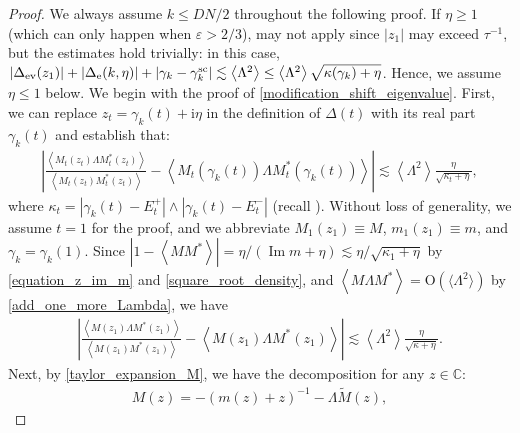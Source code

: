 \documentclass[10pt,reqno]{amsart}
\numberwithin{equation}{section}
\numberwithin{figure}{section}
\theoremstyle{plain} %
\theoremstyle{definition} %
\newcommand{\wt}{\widetilde}
\renewcommand{\txt}[1]{\text{\rm{#1}}}
\newcommand{\C}{\mathbb{C}}
\newcommand{\ii}{\mathrm{i}}
\renewcommand{\leq}{\le}
\renewcommand{\tilde}{\wt}
\newcommand{\pa}[1]{\left({#1}\right)}
\newcommand{\absa}[1]{\left\lvert #1 \right\rvert}
\newcommand{\avg}[1]{\langle #1 \rangle}
\newcommand{\avga}[1]{\left\langle #1 \right\rangle}
\DeclareMathOperator{\im}{\mathrm{Im}}
\newcommand{\OO}{\mathrm{O}}
\numberwithin{equation}{section}
\begin{document}
\begin{proof}
We always assume $k\leq DN/2$ throughout the following proof. If $\eta\ge 1$ (which can only happen when $\varepsilon>2/3$),  may not apply since $|z_1|$ may exceed $\tau^{-1}$, but the estimates hold trivially: in this case, $|\Delta_{\txt{ev}}(z_1)|+|\Delta_{\txt{e}}(k,\eta)|+|\gamma_k-\gamma_k^{\txt{sc}}|\lesssim\avga{\Lambda^2}\le\avga{\Lambda^2}\sqrt{\kappa(\gamma_k)+\eta}$. Hence, we assume $\eta\le 1$ below. We begin with the proof of \eqref{modification_shift_eigenvalue}. First, we can replace $z_t=\gamma_k(t)+\ii \eta$ in the definition of $\Delta(t)$ with its real part $\gamma_k\pa{t}$ and establish that:    \begin{equation}\label{estimate_change_definition_of_shift_eigenvalue}    
        \begin{aligned}        
            \absa{\frac{\avga{M_t(z_t)\Lambda M_t^{*}(z_t)}}{\avga{M_t(z_t)M_t^{*}(z_t)}}-\avga{M_t(\gamma_k(t))\Lambda M_t^{*}(\gamma_k(t))}}\lesssim \avga{\Lambda^2} \frac{\eta}{\sqrt{\kappa_t+\eta}},
        \end{aligned}
    \end{equation}
    where $\kappa_t=\absa{\gamma_k(t)-E_t^+}\wedge\absa{\gamma_k(t)-E_t^-}$ (recall ). 
    Without loss of generality, we assume $t=1$ for the proof, and we abbreviate $M_1(z_1)\equiv M$, $m_1(z_1)\equiv m$, and $\gamma_k=\gamma_k(1)$. %
    Since $\absa{1-\avga{MM^{*}}}=\eta/\pa{\im m+\eta}\lesssim \eta/\sqrt{\kappa_1+\eta}$ by \eqref{equation_z_im_m} and \eqref{square_root_density}, and $\avga{M\Lambda M^{*}}=\OO(\avg{\Lambda^2})$ by \eqref{add_one_more_Lambda}, we have
    \begin{equation}\label{first_modification_shift_eigenvalue}
        \begin{aligned}
            \absa{\frac{\avga{M(z_1)\Lambda M^{*}(z_1)}}{\avga{M(z_1)M^{*}(z_1)}}-\avga{M(z_1)\Lambda M^{*}(z_1)}}\lesssim \avga{\Lambda^2} \frac{\eta}{\sqrt{\kappa+\eta}}.
        \end{aligned}
    \end{equation}
Next, by \eqref{taylor_expansion_M}, we have the decomposition for any $z\in \C$:
\begin{equation}\label{first_order_decomposition_M}
        \begin{aligned}
            M(z)=-\pa{m (z) +z}^{-1}-\Lambda \tilde{M} (z) ,

\end{aligned}
\end{equation}
\end{proof}
\end{document}
